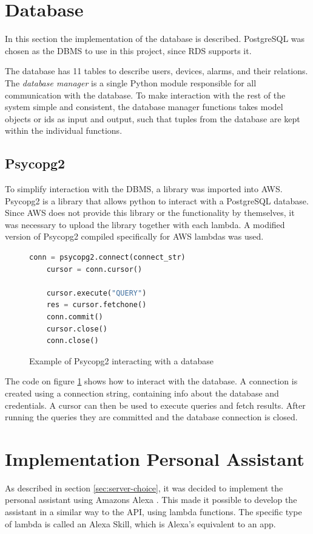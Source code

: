 \section{Database}
In this section the implementation of the database is described. PostgreSQL was chosen as the DBMS to use in this project, since RDS supports it.

The database has 11 tables to describe users, devices, alarms, and their relations. The \textit{database manager} is a single Python module responsible for all communication with the database. To make interaction with the rest of the system simple and consistent, the database manager functions takes model objects or ids as input and output, such that tuples from the database are kept within the individual functions. 

\subsection{Psycopg2}
To simplify interaction with the DBMS, a library was imported into AWS.
Psycopg2 is a library that allows python to interact with a PostgreSQL database. Since AWS does not provide this library or the functionality by themselves, it was necessary to upload the library together with each lambda. A modified version of Psycopg2 compiled specifically for AWS lambdas was used.

\begin{figure}[H]
    \centering
    \begin{lstlisting}[language=Python]
    conn = psycopg2.connect(connect_str)
    cursor = conn.cursor()

    cursor.execute("QUERY")
    res = cursor.fetchone()
    conn.commit()
    cursor.close()
    conn.close()
    \end{lstlisting}
    \caption{Example of Psycopg2 interacting with a database}
    \label{fig:psycopg2example}
\end{figure}

The code on figure \ref{fig:psycopg2example} shows how to interact with the database. A connection is created using a connection string, containing info about the database and credentials. A cursor can then be used to execute queries and fetch results. After running the queries they are committed and the database connection is closed.

\section{Implementation Personal Assistant}\label{sec:alexa}
As described in section \ref{sec:server-choice}, it was decided to implement the personal assistant using Amazons Alexa \cite{alexa}. This made it possible to develop the assistant in a similar way to the API, using lambda functions. The specific type of lambda is called an Alexa Skill, which is Alexa's equivalent to an app.

